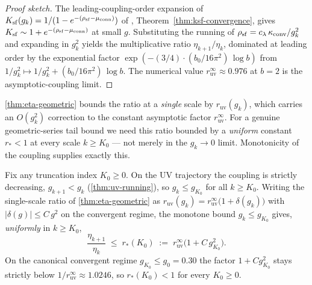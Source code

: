 \begin{proof}[Proof sketch]
The leading-coupling-order expansion of
$K_{\mathrm{sf}}(g_k) = 1/(1 - e^{-(\rho_{\mathrm{sf}} - \mu_{\mathrm{conn}})})$
of ,
Theorem~\ref{thm:ksf-convergence}, gives
$K_{\mathrm{sf}} \sim 1 + e^{-(\rho_{\mathrm{sf}} - \mu_{\mathrm{conn}})}$ at small $g$.
Substituting the running of $\rho_{\mathrm{sf}} = c_\lambda\,\kappa_{\mathrm{conv}}/g_k^2$
and expanding in $g_k^2$ yields the multiplicative ratio
$\eta_{k+1}/\eta_k$, dominated at leading order by the exponential
factor $\exp(-(3/4) \cdot (b_0/16\pi^2)\,\log b)$ from
$1/g_k^2 \mapsto 1/g_k^2 + (b_0/16\pi^2)\,\log b$.  The numerical
value $r_{\mathrm{uv}}^\infty \approx 0.976$ at $b = 2$ is the
asymptotic-coupling limit.
\end{proof}

\cref{thm:eta-geometric} bounds the ratio at a \emph{single} scale by
$r_{\mathrm{uv}}(g_k)$, which carries an $O(g_k^2)$ correction to the
constant asymptotic factor $r_{\mathrm{uv}}^\infty$.  For a genuine
geometric-series tail bound we need this ratio bounded by a
\emph{uniform} constant $r_\ast < 1$ at every scale $k \ge K_0$ ---
not merely in the $g_k \to 0$ limit.  Monotonicity of the coupling
supplies exactly this.

\begin{lemma}
\label{lem:uniform-decay}
Fix any truncation index $K_0 \ge 0$.  On the UV trajectory the
coupling is strictly decreasing, $g_{k+1} < g_k$
(\cref{thm:uv-running}), so $g_k \le g_{K_0}$ for all $k \ge K_0$.
Writing the single-scale ratio of \cref{thm:eta-geometric} as
$r_{\mathrm{uv}}(g_k) = r_{\mathrm{uv}}^\infty\bigl(1 + \delta(g_k)\bigr)$
with $|\delta(g)| \le C\,g^2$ on the convergent regime, the
monotone bound $g_k \le g_{K_0}$ gives, \emph{uniformly} in $k \ge K_0$,
\begin{equation}
  \label{eq:uniform-rate}
  \frac{\eta_{k+1}}{\eta_k}
  \;\le\;
  r_\ast(K_0)
  \;:=\;
  r_{\mathrm{uv}}^\infty\bigl(1 + C\,g_{K_0}^2\bigr) .
\end{equation}
On the canonical convergent regime $g_{K_0} \le g_0 = 0.30$ the factor
$1 + C g_{K_0}^2$ stays strictly below $1/r_{\mathrm{uv}}^\infty
\approx 1.0246$, so $r_\ast(K_0) < 1$ for every $K_0 \ge 0$.
\end{lemma}

